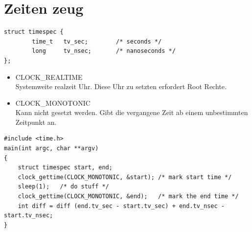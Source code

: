 \documentclass[12pt,a4paper,oneside,ngerman]{article}
\begin{document}




\section[Zeiten zeug]{Zeiten zeug}
\begin{lstlisting}
struct timespec {
        time_t   tv_sec;        /* seconds */
        long     tv_nsec;       /* nanoseconds */
};
\end{lstlisting}

\begin{itemize}
	\item CLOCK\_REALTIME\\ Systemweite realzeit Uhr. Diese Uhr zu setzten erfordert Root Rechte.
	\item CLOCK\_MONOTONIC\\ Kann nicht gesetzt werden. Gibt die vergangene Zeit ab einem unbestimmten Zeitpunkt an.
\end{itemize}

\begin{lstlisting}
#include <time.h>
main(int argc, char **argv)
{
	struct timespec start, end;
	clock_gettime(CLOCK_MONOTONIC, &start);	/* mark start time */
	sleep(1);	/* do stuff */
	clock_gettime(CLOCK_MONOTONIC, &end);	/* mark the end time */
	int diff = diff (end.tv_sec - start.tv_sec) + end.tv_nsec - start.tv_nsec;
}
\end{lstlisting}
\end{document}
